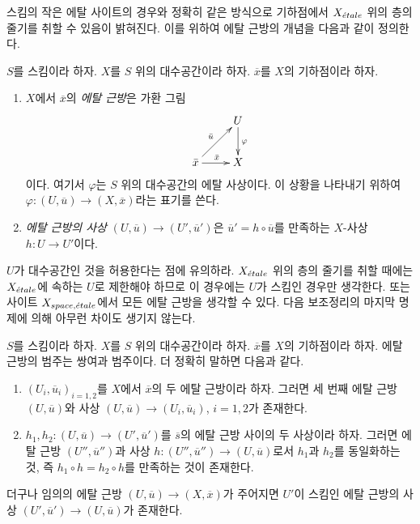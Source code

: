 \noindent
스킴의 작은 에탈 사이트의 경우와 정확히 같은 방식으로
기하점에서 $X_{\acute{e}tale}$ 위의 층의 줄기를 취할 수 있음이 밝혀진다.
이를 위하여 에탈 근방의 개념을 다음과 같이 정의한다.

\begin{definition}
\label{definition-etale-neighbourhood}
$S$를 스킴이라 하자. $X$를 $S$ 위의 대수공간이라 하자.
$\overline{x}$를 $X$의 기하점이라 하자.
\begin{enumerate}
\item $X$에서 $\overline{x}$의 {\it 에탈 근방}은 가환 그림
$$
\xymatrix{
& U \ar[d]^\varphi \\
{\bar x} \ar[r]^{\bar x} \ar[ur]^{\bar u} & X
}
$$
이다. 여기서 $\varphi$는 $S$ 위의 대수공간의 에탈 사상이다.
이 상황을 나타내기 위하여
$\varphi : (U, \overline{u}) \to (X, \overline{x})$라는 표기를 쓴다.
\item {\it 에탈 근방의 사상}
$(U, \overline{u}) \to (U', \overline{u}')$은
$\overline{u}' = h \circ \overline{u}$를 만족하는
$X$-사상 $h : U \to U'$이다.
\end{enumerate}
\end{definition}

\noindent
$U$가 대수공간인 것을 허용한다는 점에 유의하라.
$X_{\acute{e}tale}$ 위의 층의 줄기를 취할 때에는 $X_{\acute{e}tale}$에 속하는
$U$로 제한해야 하므로 이 경우에는 $U$가 스킴인 경우만 생각한다.
또는 사이트 $X_{space, {\acute{e}tale}}$에서 모든 에탈 근방을 생각할 수 있다.
다음 보조정리의 마지막 명제에 의해 아무런 차이도 생기지 않는다.

\begin{lemma}
\label{lemma-cofinal-etale}
$S$를 스킴이라 하자. $X$를 $S$ 위의 대수공간이라 하자.
$\overline{x}$를 $X$의 기하점이라 하자.
에탈 근방의 범주는 쌍여과 범주이다. 더 정확히 말하면 다음과 같다.
\begin{enumerate}
\item $(U_i, \overline{u}_i)_{i = 1, 2}$를 $X$에서
$\overline{x}$의 두 에탈 근방이라 하자. 그러면 세 번째 에탈 근방
$(U, \overline{u})$와 사상
$(U, \overline{u}) \to (U_i, \overline{u}_i)$, $i = 1, 2$가 존재한다.
\item
$h_1, h_2: (U, \overline{u}) \to (U', \overline{u}')$를
$\overline{s}$의 에탈 근방 사이의 두 사상이라 하자.
그러면 에탈 근방 $(U'', \overline{u}'')$과 사상
$h : (U'', \overline{u}'') \to (U, \overline{u})$로서
$h_1$과 $h_2$를 동일화하는 것, 즉
$h_1 \circ h = h_2 \circ h$를 만족하는 것이 존재한다.
\end{enumerate}
더구나 임의의 에탈 근방
$(U, \overline{u}) \to (X, \overline{x})$가 주어지면
$U'$이 스킴인 에탈 근방의 사상
$(U', \overline{u}') \to (U, \overline{u})$가 존재한다.
\end{lemma}

